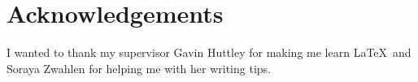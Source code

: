 \chapter*{Acknowledgements}

I wanted to thank my supervisor Gavin Huttley for making me learn \LaTeX\ and Soraya Zwahlen for helping me with her writing tips.